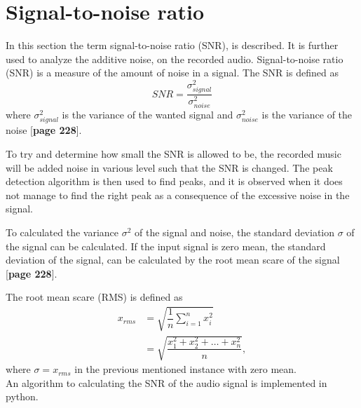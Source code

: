 \section{Signal-to-noise ratio}
In this section the term signal-to-noise ratio (SNR), is described.
It is further used to analyze the additive noise, on the recorded audio.
Signal-to-noise ratio (SNR) is a measure of the amount of noise in a signal. 
The SNR is defined as
\begin{equation}\label{eq:SNR}
	SNR=\frac{\sigma_{signal}^2}{\sigma_{noise}^2}
\end{equation}
where $\sigma_{signal}^2$ is the variance of the wanted signal and $\sigma_{noise}^2$ is the variance of the noise [\textbf{page 228}\cite{DTSP}].

To try and determine how small the SNR is allowed to be, the recorded music will be added noise in various level such that the SNR is changed. 
The peak detection algorithm is then used to find peaks, and it is observed when it does not manage to find the right peak as a consequence of the excessive noise in the signal.

To calculated the variance $\sigma^2$ of the signal and noise, the standard deviation $\sigma$ of the signal can be calculated. 
If the input signal is zero mean, the standard deviation of the signal, can be calculated by the root mean scare of the signal [\textbf{page 228}\cite{DTSP}].

The root mean scare (RMS) is defined as
\begin{align*}
	x_{rms} 
	&=\sqrt{\dfrac{1}{n} \sum_{i=1}^n x_i^2}\\
	&= \sqrt{\dfrac{x_1^2 + x_2^2 + \dots + x_n^2}{n}},
\end{align*}
where $\sigma = x_{rms}$ in the previous mentioned instance with zero mean.\\
An algorithm to calculating the SNR of the audio signal is implemented in python.

%










